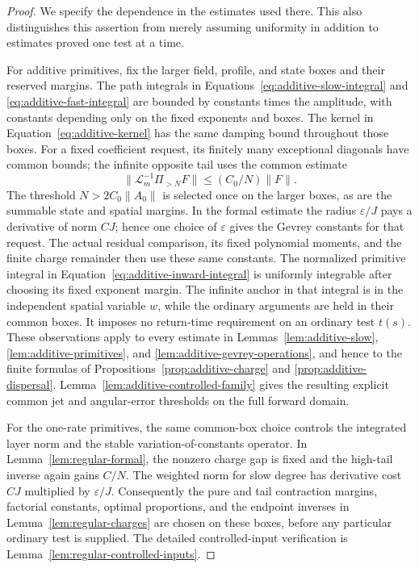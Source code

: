 \begin{proof}
We specify the dependence in the estimates used there.  This also
distinguishes this assertion from merely assuming uniformity in addition
to estimates proved one test at a time.

For additive primitives, fix the larger field, profile, and state boxes
and their reserved margins.  The path integrals in
Equations~\eqref{eq:additive-slow-integral} and
\eqref{eq:additive-fast-integral} are bounded by constants times the
amplitude, with constants depending only on the fixed exponents and
boxes.  The kernel in Equation~\eqref{eq:additive-kernel} has the same
damping bound throughout those boxes.  For a fixed coefficient request,
its finitely many exceptional diagonals have common bounds; the infinite
opposite tail uses the common estimate
\[
 \|\mathcal L_m^{-1}\Pi_{>N}F\|
 \le (C_0/N)\|F\|.
\]
The threshold $N>2C_0\|A_0\|$ is selected once on the larger boxes,
as are the summable state and spatial margins.  In the formal estimate
the radius $\varepsilon/J$ pays a derivative of norm $CJ$; hence one
choice of $\varepsilon$ gives the Gevrey constants for that request.
The actual residual comparison, its fixed polynomial moments, and the
finite charge remainder then use these same constants.  The normalized
primitive integral in Equation~\eqref{eq:additive-inward-integral}
is uniformly integrable after choosing its fixed exponent margin.
The infinite anchor in that integral is in the independent spatial
variable $w$, while the ordinary arguments are held in their common
boxes.  It imposes no return-time requirement on an ordinary test
$t(s)$.  These observations apply to every estimate in
Lemmas~\ref{lem:additive-slow}, \ref{lem:additive-primitives}, and
\ref{lem:additive-gevrey-operations}, and hence to the finite formulas of
Propositions~\ref{prop:additive-charge} and
\ref{prop:additive-dispersal}.
Lemma~\ref{lem:additive-controlled-family} gives the resulting explicit
common jet and angular-error thresholds on the full forward domain.

For the one-rate primitives, the same common-box choice controls the
integrated layer norm and the stable variation-of-constants operator.
In Lemma~\ref{lem:regular-formal}, the nonzero charge gap is fixed and
the high-tail inverse again gains $C/N$.  The weighted norm for slow
degree has derivative cost $CJ$ multiplied by $\varepsilon/J$.
Consequently the pure and tail contraction margins, factorial constants,
optimal proportions, and the endpoint inverses in
Lemma~\ref{lem:regular-charges} are chosen on these boxes, before any
particular ordinary test is supplied.  The detailed controlled-input
verification is Lemma~\ref{lem:regular-controlled-inputs}.


\end{proof}
